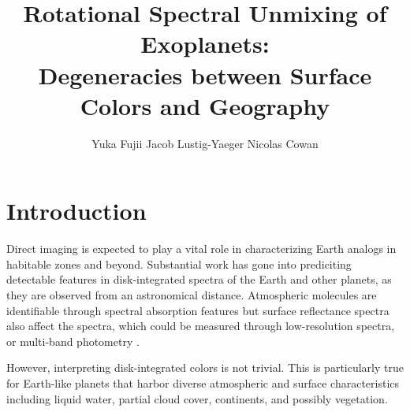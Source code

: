 \documentclass[iop,numberedappendix,apj,]{emulateapj}
\begin{document}
\title{Rotational Spectral Unmixing of Exoplanets:\\Degeneracies between Surface Colors and Geography}


\author{
%
Yuka Fujii 
%
Jacob Lustig-Yaeger 
%
Nicolas Cowan 
%
}

      
  
  



\vspace{0.5\baselineskip}


\begin{abstract}

\end{abstract}

  



\section{Introduction}
\label{sec:intro}

Direct imaging is expected to play a vital role in characterizing Earth analogs in habitable zones and beyond. 
Substantial work has gone into prediciting detectable features in disk-integrated spectra of the Earth and other planets, as they are observed from an astronomical distance. 
Atmospheric molecules are identifiable through spectral absorption features \citep[e.g.,][]{DesMarais2002} but surface reflectance spectra also affect the spectra, which could be measured through low-resolution spectra, or multi-band photometry \citep[e.g.,][]{Ford2001}. 

However, interpreting disk-integrated colors is not trivial. 
This is particularly true for Earth-like planets that harbor diverse atmospheric and surface characteristics including liquid water, partial cloud cover, continents, and possibly vegetation. 
\end{document}
